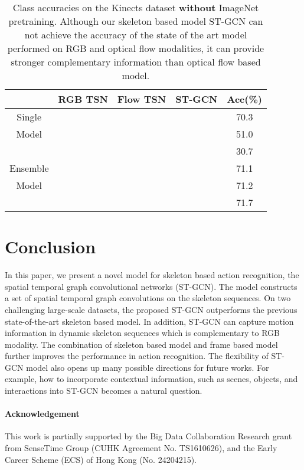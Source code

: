 \documentclass[letterpaper]{article} \usepackage{aaai18}  \usepackage{times}  \usepackage{helvet}  \usepackage{courier}  \usepackage{url}  \usepackage{graphicx}
\begin{document}
\begin{table}
	\small
	\centering
	\begin{tabular}{c|ccc|c}
		  &RGB TSN   &   Flow TSN &   ST-GCN   &Acc(\%) \\
		\hline
		\hline
		 Single&\checkmark &            &            & 70.3\\ 
		 Model&           & \checkmark &            & 51.0\\ 
		 &           &            & \checkmark & 30.7\\ \hline
		 Ensemble&\checkmark &\checkmark  &            & 71.1\\
		 Model&\checkmark &            & \checkmark & 71.2\\ 
		 &\checkmark &\checkmark  & \checkmark & 71.7\\ 


	\end{tabular}
	\caption{Class accuracies on the Kinects dataset \textbf{without} ImageNet pretraining. Although our skeleton based model ST-GCN can not achieve the accuracy of the state of the art model performed on RGB and optical flow modalities, it can provide stronger complementary information than optical flow based model.}\label{tab:kinetics_ensemble}
\end{table}


\section{Conclusion}
In this paper, we present a novel model for skeleton based action recognition, the spatial temporal graph convolutional networks (ST-GCN).
The model constructs a set of spatial temporal graph convolutions on the skeleton sequences.
On two challenging large-scale datasets, the proposed ST-GCN outperforms the previous state-of-the-art skeleton based model. 
In addition, ST-GCN can capture motion information in dynamic skeleton sequences which is complementary to RGB modality. The combination of skeleton based model and frame based model further improves the performance in action recognition.
The flexibility of ST-GCN model also opens up many possible directions for future works. 
For example, how to incorporate contextual information, such as scenes, objects, and interactions into ST-GCN becomes a natural question. 

\paragraph{Acknowledgement} This work is partially supported by the Big Data Collaboration Research grant from SenseTime Group (CUHK Agreement No. TS1610626), and the Early Career Scheme (ECS) of Hong Kong (No. 24204215).




{
	
	
}
\end{document}
